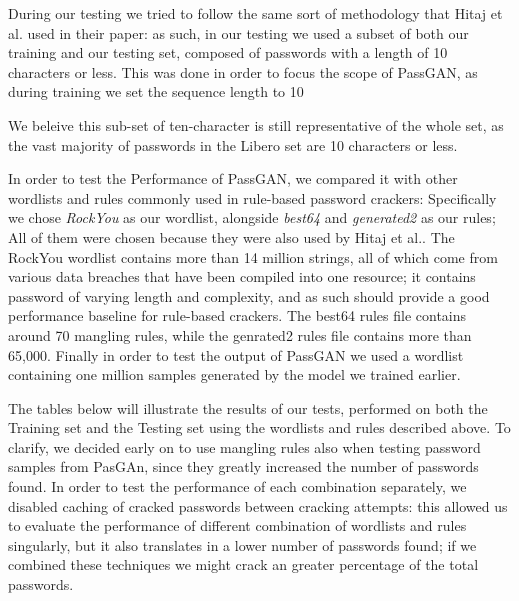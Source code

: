 During our testing we tried to follow the same sort of methodology that Hitaj et al.\cite{PassGAN} used in their paper: as such, in our testing we used a subset of both our training  and our testing set, composed of passwords with a length of 10 characters or less. This was done in order to focus the scope of PassGAN, as during training we set the sequence length to 10 %

We beleive this sub-set of ten-character is still representative of the whole set, as the vast majority of passwords in the Libero set are 10 characters or less. 

In order to test the Performance of PassGAN, we compared it with other wordlists and rules commonly used in rule-based password crackers: Specifically we chose \emph{RockYou} as our wordlist, alongside \emph{best64} and \emph{generated2} as our rules; All of them were chosen because they were also used by Hitaj et al.\cite{PassGAN}.
The RockYou wordlist contains more than 14 million strings, all of which come from various data breaches that have been compiled into one resource; it contains password of varying length and complexity, and as such should provide a good performance baseline for rule-based crackers. The best64 rules file contains around 70 mangling rules, while the genrated2 rules file contains more than 65,000. 
Finally in order to test the output of PassGAN we used a wordlist containing one million samples generated by the model we trained earlier.

The tables below will illustrate the results of our tests, performed on both the Training set and the Testing set using the wordlists and rules described above. To clarify, we decided early on to use mangling rules also when testing password samples from PasGAn, since they greatly increased the number of passwords found. In order to test the performance of each combination separately, we disabled caching of cracked passwords between cracking attempts: this allowed us to evaluate the performance of different combination of wordlists and rules singularly, but it also translates in a lower number of passwords found; if we combined these techniques we might crack an greater percentage of the total passwords.


